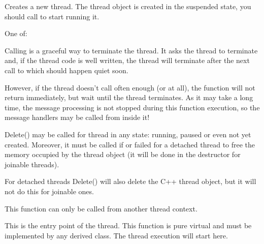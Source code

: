 \label{wxthreadcreate}


Creates a new thread. The thread object is created in the suspended state, you
should call  to start running it.


One of:

\twocolwidtha{7cm}
\begin{twocollist}\itemsep=0pt
\end{twocollist}

\label{wxthreaddelete}


Calling  is a graceful way to terminate the
thread. It asks the thread to terminate and, if the thread code is well
written, the thread will terminate after the next call to 
 which should happen quiet soon.

However, if the thread doesn't call  
often enough (or at all), the function will not return immediately, but wait
until the thread terminates. As it may take a long time, the message processing
is not stopped during this function execution, so the message handlers may be
called from inside it!

Delete() may be called for thread in any state: running, paused or even not yet
created. Moreover, it must be called if  or
 failed for a detached thread to free the memory
occupied by the thread object (it will be done in the destructor for joinable
threads).

For detached threads Delete() will also delete the C++ thread object, but it
will not do this for joinable ones.

This function can only be called from another thread context.

\label{wxthreadentry}


This is the entry point of the thread. This function is pure virtual and must
be implemented by any derived class. The thread execution will start here.


